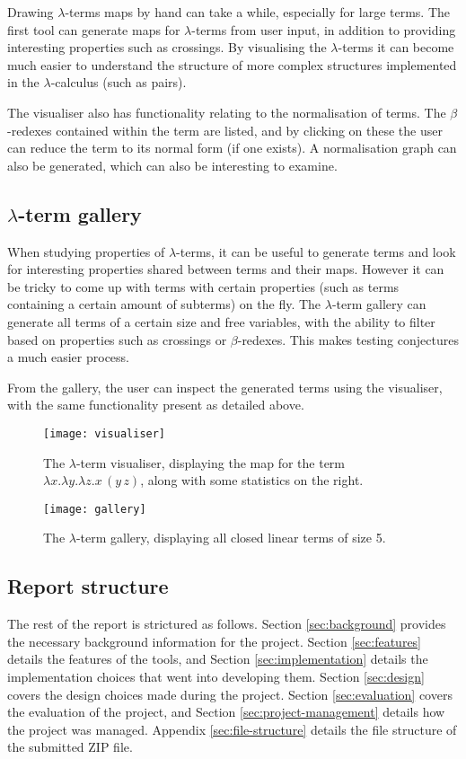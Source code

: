 \documentclass[11pt]{article}
\begin{document}
Drawing $\lambda$-terms maps by hand can take a while, especially for large terms. The first tool can generate maps for $\lambda$-terms from user input, in addition to providing interesting properties such as crossings. By visualising the $\lambda$-terms it can become much easier to understand the structure of more complex structures implemented in the $\lambda$-calculus (such as pairs).

The visualiser also has functionality relating to the normalisation of terms. The $\beta$-redexes contained within the term are listed, and by clicking on these the user can reduce the term to its normal form (if one exists). A normalisation graph can also be generated, which can also be interesting to examine.

\subsection{\texorpdfstring{$\lambda$}{lambda}-term gallery}
When studying properties of $\lambda$-terms, it can be useful to generate terms and look for interesting properties shared between terms and their maps. However it can be tricky to come up with terms with certain properties (such as terms containing a certain amount of subterms) on the fly. The $\lambda$-term gallery can generate all terms of a certain size and free variables, with the ability to filter based on properties such as crossings or $\beta$-redexes. This makes testing conjectures a much easier process.

From the gallery, the user can inspect the generated terms using the visualiser, with the same functionality present as detailed above.

\begin{figure}
    \centering
    \texttt{[image: visualiser]}
    \caption{The $\lambda$-term visualiser, displaying the map for the term $\lambda x. \lambda y. \lambda z. x \, (y \, z)$, along with some statistics on the right.}
    \label{fig:visualiser}
\end{figure}

\begin{figure}
    \centering
    \texttt{[image: gallery]}
    \caption{The $\lambda$-term gallery, displaying all closed linear terms of size 5.}
    \label{fig:gallery}
\end{figure}

\subsection{Report structure}
The rest of the report is strictured as follows. Section \ref{sec:background} provides the necessary background information for the project. Section \ref{sec:features} details the features of the tools, and Section \ref{sec:implementation} details the implementation choices that went into developing them. Section \ref{sec:design} covers the design choices made during the project. Section \ref{sec:evaluation} covers the evaluation of the project, and Section \ref{sec:project-management} details how the project was managed. Appendix \ref{sec:file-structure} details the file structure of the submitted ZIP file.
\end{document}
